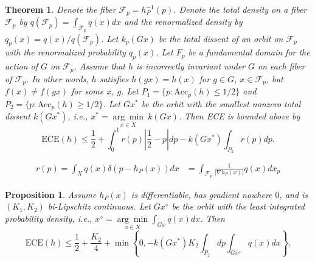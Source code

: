 \documentclass[10pt,a4paper]{amsart}
\newtheorem{proposition}{Proposition}
\newtheorem{thm}{Theorem}
\newcommand{\Acc}{\mathrm{Acc}_p(h)}
\newcommand{\ECE}{\mathrm{ECE}(h)}
\begin{document}
\begin{thm} \label{thm:inc_bound}  Denote the fiber $\mathcal{F}_p = h_P^{-1}(p)$. Denote the total density on a fiber $\mathcal{F}_p$ by $q(\mathcal{F}_p) = \int_{\mathcal{F}_p}q(x)dx$ and the renormalized density by $q_p(x) = q(x)/q(\mathcal{F}_p)$. Let $k_p(Gx)$ be the total dissent of an orbit on $\mathcal{F}_p$ with the renormalized probability $q_p(x)$. Let $F_p$ be a fundamental domain for the action of $G$ on $\mathcal{F}_p$. Assume that $h$ is incorrectly invariant under $G$ on each fiber of $\mathcal{F}_p$. In other words, $h$ satisfies $h(gx) = h(x)$ for $g \in G$, $x \in \mathcal{F}_p$, but $f(x) \neq f(gx)$ for some $x$, $g$. Let  $P_1 = \{ p \colon \Acc \leq 1/2\}$ and $P_2 = \{ p \colon \Acc \geq 1/2\}$. Let $Gx^*$ be the orbit with the smallest nonzero total dissent $k(Gx^*)$, i.e., $x^* = \underset{x \in X}{\arg \min} ~k(Gx) $.  Then ECE is bounded above by 
\[
\ECE  \leq \frac{1}{2} + \int_0^{1}r(p)\left|\frac{1}{2} - p\right|dp -  k(Gx^*)\int_{P_2}r(p) dp. 
\] 
\end{thm}

\begin{align}
  r(p) = \int_Xq(x)\delta(p - h_P(x))dx &= \int_{\mathcal{F}_p}\frac{1}{|\nabla h_P(x)|}q(x)dx_p \label{eq:reparam_density}
\end{align}

\begin{proposition}\label{prop:bilipschitzbounds}
Assume $h_P(x)$ is differentiable, has gradient nowhere $0$, and is $(K_1, K_2)$ bi-Lipschitz continuous. Let $Gx^\diamond$ be the orbit with the least integrated probability density, i.e., $x^\diamond = \underset{x \in X}{\arg \min} \int_{Gx}q(x)dx$. 
Then
\[
\ECE \leq \frac{1}{2} + \frac{K_2}{4} + \min \left\{ 0, - k(Gx^*)K_2\int_{P_2}dp\int_{Gx^\diamond}q(x)dx \right\}.
\]
\end{proposition}
\end{document}
